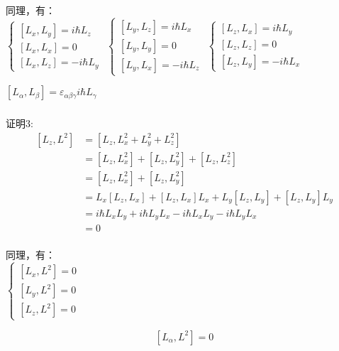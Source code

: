 \begin{frame} 
    同理，有：\\
    $\begin{cases}
        [L_x,L_y]= i\hbar L_z  \\ 
        [L_x,L_x]= 0  \\ 
        [L_x,L_z]= -i\hbar L_y 
    \end{cases}$
    $\begin{cases}
        [L_y,L_z]= i\hbar L_x  \\ 
        [L_y,L_y]= 0  \\ 
        [L_y,L_x]= -i\hbar L_z 
    \end{cases}$
    $\begin{cases}
        [L_z,L_x]= i\hbar L_y  \\ 
        [L_z,L_z]= 0  \\ 
        [L_z,L_y]= -i\hbar L_x 
    \end{cases}$
    \begin{tcolorbox4}[角动量对易关系1]
        $ [L_\alpha,L_\beta]= \varepsilon_{\alpha\beta\gamma} i\hbar L_\gamma $ 
    \end{tcolorbox4}
\end{frame} 

\begin{frame}
    \frametitle{}
    \alert{证明3:} 
    \begin{equation*}
        \begin{split}
        [L_z,L^2]&= [L_z,L_x ^2+L_y ^2+L_z ^2]\\
        &=[L_z,L_x ^2]+[L_z,L_y ^2]+[L_z,L_z ^2]\\
        &=[L_z,L_x ^2]+[L_z,L_y ^2]\\
        &=L_x[L_z,L_x] +[L_z,L_x]L_x +L_y[L_z,L_y] +[L_z,L_y]L_y\\
        &=i\hbar L_x L_y +i\hbar L_yL_x - i\hbar L_x L_y -i\hbar L_yL_x\\
        &=0 \\
        \end{split}  
    \end{equation*}
\end{frame} 

\begin{frame}     
    同理，有：\\
    $\begin{cases}
        [L_x,L^2]= 0  \\ 
        [L_y,L^2]= 0  \\ 
        [L_z,L^2]= 0 
    \end{cases}$
    \begin{tcolorbox4}[角动量对易关系2]
        $$ [L_\alpha,L^2]= 0 $$ 
    \end{tcolorbox4}
\end{frame} 

